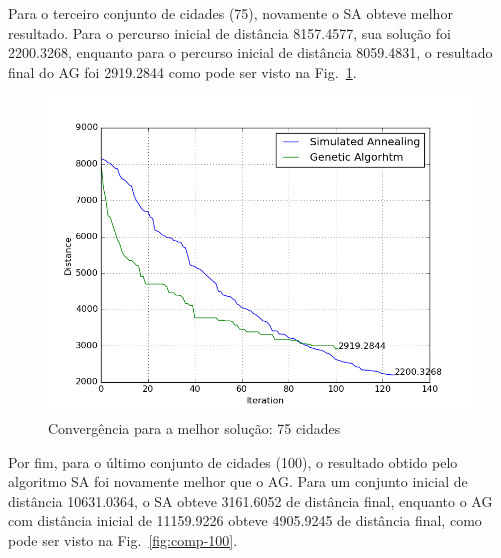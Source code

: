 \documentclass[journal, a4paper]{IEEEtran}
\begin{document}
    Para o terceiro conjunto de cidades (75), novamente o SA obteve melhor resultado. Para o percurso inicial de distância 8157.4577, sua solução foi 2200.3268, enquanto para o percurso inicial de distância 8059.4831, o resultado final do AG foi 2919.2844 como pode ser visto na Fig.~\ref{fig:comp-75}.

    \begin{figure}[H]
		\begin{center}
		\includegraphics[width=\columnwidth]{75-comparacao.png}
		\caption{Convergência para a melhor solução: 75 cidades}
		\label{fig:comp-75}
		\end{center}
	\end{figure}

    Por fim, para o último conjunto de cidades (100), o resultado obtido pelo algoritmo SA foi novamente melhor que o AG. Para um conjunto inicial de distância 10631.0364, o SA obteve 3161.6052 de distância final, enquanto o AG com distância inicial de 11159.9226 obteve 4905.9245 de distância final, como pode ser visto na Fig.~\ref{fig:comp-100}.
\end{document}
